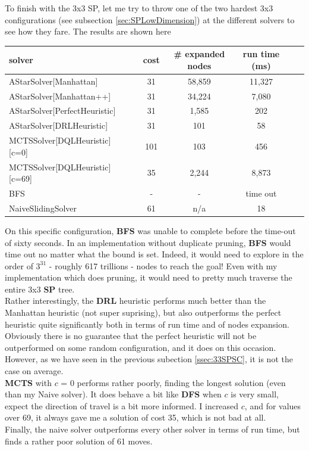 \label{ssec:33SPHard}
To finish with the 3x3 SP, let me try to throw one of the two hardest 3x3 configurations (see subsection \ref{sec:SPLowDimension}) at the different solvers to see how they fare. The results are shown here

\begin{center}
\begin{tabular}{l*{5}{c}r}
\hline
\textbf{solver}      & & \textbf{cost} & \textbf{\# expanded nodes} & \textbf{run time (ms)} \\
\hline
AStarSolver[Manhattan]   &   &      31  & 58,859  & 11,327  \\
\hline
AStarSolver[Manhattan++]   &   &      31  & 34,224  & 7,080  \\
\hline
AStarSolver[PerfectHeuristic]  &   & 31 & 1,585 & 202 \\
\hline
AStarSolver[DRLHeuristic]  &   & 31 & 101 & 58 \\
\hline
MCTSSolver[DQLHeuristic][c=0]  &   & 101 & 103 & 456 \\
\hline
MCTSSolver[DQLHeuristic][c=69]  &   & 35 & 2,244 & 8,873 \\
\hline
BFS  &   & - & - & time out \\
\hline
NaiveSlidingSolver  &   & 61 & n/a & 18 \\
\hline
\end{tabular}
\end{center}
On this specific configuration, \textbf{BFS} was unable to complete before the time-out of sixty seconds. In an implementation without duplicate pruning, \textbf{BFS} would time out no matter what the bound is set. Indeed, it would need to explore in the order of $3^{31}$ - roughly 617 trillions - nodes to reach the goal! Even with my implementation which does pruning, it would need to pretty much traverse the entire 3x3 \textbf{SP} tree.
\\
Rather interestingly, the \textbf{DRL} heuristic performs much better than the Manhattan heuristic (not super suprising), but also outperforms the perfect heuristic quite significantly both in terms of run time and of nodes expansion. Obviously there is no guarantee that the perfect heuristic will not be outperformed on some random configuration, and it does on this occasion. However, as we have seen in the previous subection \ref{ssec:33SPSC}, it is not the case on average.
\\
\textbf{MCTS} with $c$ = 0 performs rather poorly, finding the longest solution (even than my Naive solver). It does behave a bit like \textbf{DFS} when $c$ is very small, expect the direction of travel is a bit more informed. I increased $c$, and for values over 69, it always gave me a solution of cost 35, which is not bad at all.
\\
Finally, the naive solver outperforms every other solver in terms of run time, but finds a rather poor solution of 61 moves.



